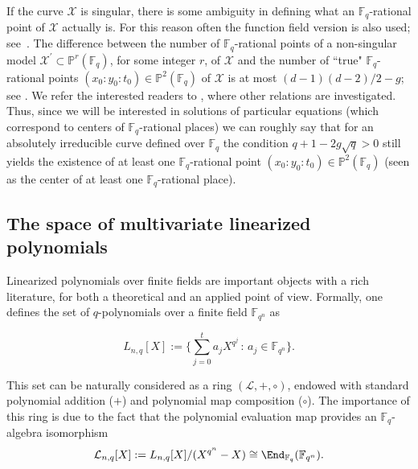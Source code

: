 If the curve $\mathcal{X}$ is singular, there is some ambiguity in defining what an $\mathbb{F}_q$-rational point of $\mathcal{X}$ actually is. For this reason often the function field version is also used; see~\cite{Stichtenoth}. The difference between the number of $\mathbb{F}_q$-rational points of a non-singular model $\mathcal{X}^{\prime}\subset \mathbb{P}^r(\mathbb{F}_q)$, for some integer $r$, of $\mathcal{X}$ and the number of  ``true" $\mathbb{F}_q$-rational  points $(x_0:y_0:t_0)\in \mathbb{P}^2(\mathbb{F}_q)$ of $\mathcal{X}$ is at most $(d-1)(d-2)/2-g$; see \cite[Lemma~9.55]{HKT}. We refer the interested readers to \cite[Section 9.6]{HKT}, where other relations are investigated. Thus, since we will be interested in solutions of particular equations (which correspond to centers of $\mathbb{F}_q$-rational places) we can roughly say that for an absolutely irreducible curve  defined over $\mathbb{F}_q$ the condition  $q + 1 - 2g\sqrt{q}>0$ still yields the existence of at least one $\mathbb{F}_q$-rational  point $(x_0:y_0:t_0)\in \mathbb{P}^2(\mathbb{F}_q)$ (seen as the center of at least one  $\mathbb{F}_q$-rational place).  

\subsection{The space of multivariate linearized polynomials}\label{Sec:2.2}
Linearized polynomials over finite fields are important objects with a rich literature, for both a theoretical and an applied point of view. 
Formally, one defines the set of $q$-polynomials over a finite field ${\mathbb F}_{q^n}$ as

$$ L_{n,q}[X]:= \Big\{ \sum_{j=0}^t a_jX^{q^j} \,:\, a_j \in {\mathbb F}_{q^n}\Big\}.$$

This set can be naturally considered as a ring $(\mathcal L, +, \circ)$, endowed with standard polynomial addition ($+$) and  polynomial map composition ($\circ$). The importance of this ring is due to the fact that the polynomial evaluation map provides an $\mathbb{F}_q$-algebra isomorphism
\begin{equation}\label{eq:poly_isomorphism}\mathcal L_{n,q}[X] := L_{n,q}[X]/(X^{q^n}-X)\cong \End_{\mathbb{F}_q}({\mathbb F}_{q^n}).
\end{equation}

